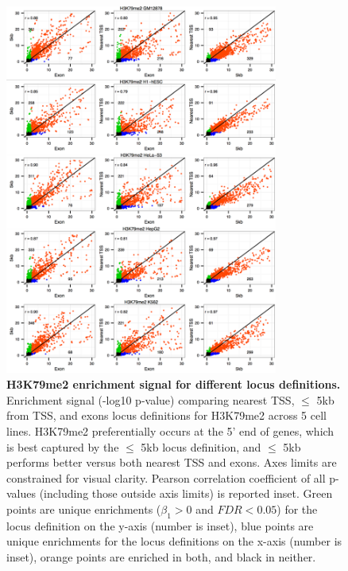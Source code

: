 \begin{figure}[ht!]
\centering
\includegraphics[width=0.8\textwidth]{chap2figs/figure2_6.pdf}
\caption[H3K79me2 enrichment signal for different locus definitions.]
{
\textbf{H3K79me2 enrichment signal for different locus definitions.} Enrichment signal (-log10 p-value) comparing nearest TSS, $\leq$ 5kb from TSS, and exons locus definitions for H3K79me2 across 5 cell lines. H3K79me2 preferentially occurs at the 5' end of genes, which is best captured by the $\leq$ 5kb locus definition, and $\leq$ 5kb performs better versus both nearest TSS and exons. Axes limits are constrained for visual clarity. Pearson correlation coefficient of all p-values (including those outside axis limits) is reported inset. Green points are unique enrichments ($\beta_1 > 0$ and $FDR < 0.05$) for the locus definition on the y-axis (number is inset), blue points are unique enrichments for the locus definitions on the x-axis (number is inset), orange points are enriched in both, and black in neither.
}
\label{chap2:fig:6}
\end{figure}

\newpage


